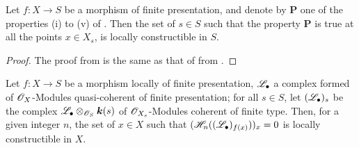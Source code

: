 \begin{corollary}[9.9.5]
\label{IV.9.9.5}
Let $f:X\to S$ be a morphism of finite presentation, and denote by $\boldsymbol{P}$ one of the properties \textup{(i)} to \textup{(v)} of .
Then the set of $s\in S$ such that the property $\boldsymbol{P}$ is true at all the points $x\in X_s$, is locally constructible in $S$.
\end{corollary}

\begin{proof}
\label{IV.9.9.5-proof}
The proof from  is the same as that of  from .
\end{proof}

\begin{proposition}[9.9.6]
\label{IV.9.9.6}
Let $f:X\to S$ be a morphism locally of finite presentation, $\mathscr{L}_\bullet$ a complex formed of $\mathscr{O}_X$-Modules quasi-coherent of finite presentation; for all $s\in S$, let $(\mathscr{L}_\bullet)_s$ be the complex $\mathscr{L}_\bullet\otimes_{\mathscr{O}_S}\boldsymbol{k}(s)$ of $\mathscr{O}_{X_s}$-Modules coherent of finite type.
Then, for a given integer $n$, the set of $x\in X$ such that $(\mathscr{H}_n((\mathscr{L}_\bullet)_{f(x)}))_x=0$ is locally constructible in $X$.
\end{proposition}

